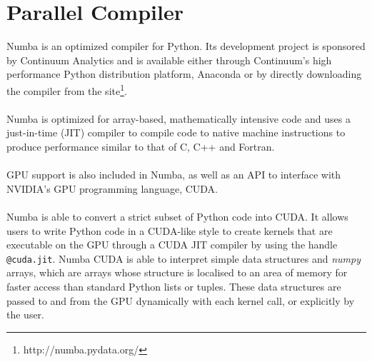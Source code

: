 \section{Parallel Compiler}
Numba is an optimized compiler for Python. Its development project is sponsored by Continuum Analytics and is available either through Continuum's high performance Python distribution platform, Anaconda or by directly downloading the compiler from the site\footnote{http://numba.pydata.org/}.
\\
\\
Numba is optimized for array-based, mathematically intensive code and uses a just-in-time (JIT) compiler to compile code to native machine instructions to produce performance similar to that of C, C++ and Fortran.
\\
\\
GPU support is also included in Numba, as well as an API to interface with NVIDIA's GPU programming language, CUDA.
\\
\\
Numba is able to convert a strict subset of Python code into CUDA. It allows users to write Python code in a CUDA-like style to create kernels that are executable on the GPU through a CUDA JIT compiler by using the handle \texttt{@cuda.jit}. Numba CUDA is able to interpret simple data structures and \textit{numpy} arrays, which are arrays whose structure is localised to an area of memory for faster access than standard Python lists or tuples. These data structures are passed to and from the GPU dynamically with each kernel call, or explicitly by the user.
